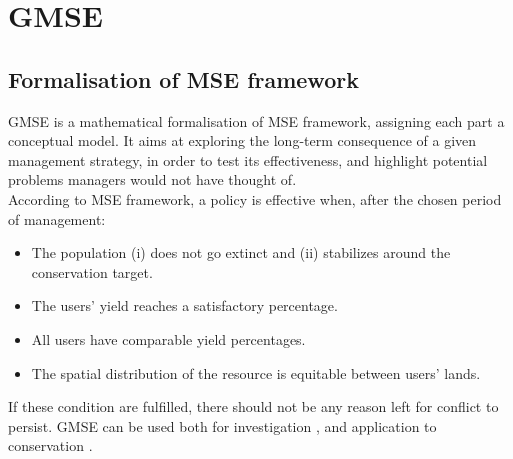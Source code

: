 \documentclass[12pt,a4paper]{article}
\begin{document}
\section{GMSE}%

\subsection{Formalisation of MSE framework}

GMSE is a mathematical formalisation of MSE framework, assigning each part a conceptual model.
It aims at exploring the long-term consequence of a given management strategy, in order to test its effectiveness, and highlight potential problems managers would not have thought of.\\
According to MSE framework, a policy is effective when, after the chosen period of management:
\begin{itemize}
    \item The population (i) does not go extinct and (ii) stabilizes around the conservation target.
    \item The users' yield reaches a satisfactory percentage.
    \item All users have comparable yield percentages.
    \item The spatial distribution of the resource is equitable between users' lands.
\end{itemize}
If these condition are fulfilled, there should not be any reason left for conflict to persist.
GMSE can be used both for investigation \citep{cusack2018time}, and application to conservation \citep{bainbridge2017goose}.\\
\end{document}

